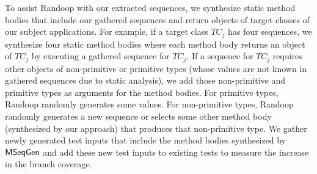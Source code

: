 \documentclass{sig-alternate}
\begin{document}
To assist Randoop with our extracted sequences, we synthesize static method bodies that include our gathered sequences and return objects of target classes of our subject applications. For example, if a target class $TC_j$ has four sequences, we synthesize four static method bodies where each method body returns an object of $TC_j$ by executing a gathered sequence for $TC_j$. If a sequence for $TC_j$ requires other objects of non-primitive or primitive types (whose values are not known in gathered sequences due to static analysis), we add those non-primitive and primitive types as arguments for the method bodies. For primitive types, Randoop randomly generates some values. For non-primitive types, Randoop randomly generates a new sequence or selects some other method body (synthesized by our approach) that produces that non-primitive type. We gather newly generated test inputs that include the method bodies synthesized by $\textsf{MSeqGen} $ and add these new test inputs to existing tests to measure the increase in the branch coverage. 
\end{document}
